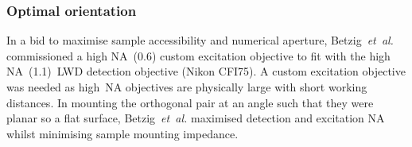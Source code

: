 \subsubsection{Optimal orientation}

In a bid to maximise sample accessibility and numerical aperture, Betzig~\emph{et~al.}~\cite{chen_lattice_2014} commissioned a high \gls{NA}~(\SI{0.6}{}) custom excitation objective to fit with the high \gls{NA}~(\SI{1.1}{})~\gls{LWD} detection objective (Nikon CFI75).
A custom excitation objective was needed as high~\gls{NA} objectives are physically large with short \gls{working distance}s.
In mounting the orthogonal pair at an angle such that they were planar so a flat surface, Betzig~\emph{et~al.} maximised detection and excitation \gls{NA} whilst minimising sample mounting impedance.

%






